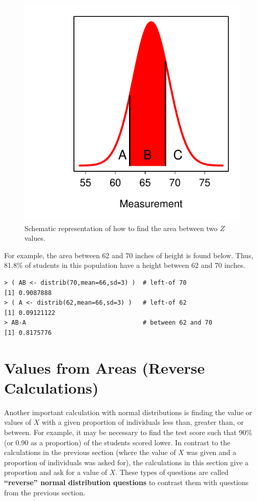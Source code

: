 \documentclass[10pt,openany]{book}\usepackage[]{graphicx}\usepackage[]{color}
\makeatletter
\newenvironment{kframe}{%
 \def\at@end@of@kframe{}%
 \ifinner\ifhmode%
  \def\at@end@of@kframe{\end{minipage}}%
  \begin{minipage}{\columnwidth}%
 \fi\fi%
 \def\FrameCommand##1{\hskip\@totalleftmargin \hskip-\fboxsep
 \colorbox{shadecolor}{##1}\hskip-\fboxsep
     \hskip-\linewidth \hskip-\@totalleftmargin \hskip\columnwidth}%
 \MakeFramed {\advance\hsize-\width
   \@totalleftmargin\z@ \linewidth\hsize
   \@setminipage}}%
 {\par\unskip\endMakeFramed%
 \at@end@of@kframe}
\newenvironment{knitrout}{}{} %
\makeatother
\begin{document}
\begin{knitrout}
\color{fgcolor}\begin{figure}[hbtp]

{\centering \includegraphics[width=.4\linewidth]{Figs/NormDistBetween-1} 

}

\caption[Schematic representation of how to find the area between two $Z$ values]{Schematic representation of how to find the area between two $Z$ values.}\label{fig:NormDistBetween}
\end{figure}


\end{knitrout}
\vspace{12pt} %

For example, the area between 62 and 70 inches of height is found below. Thus, 81.8\% of students in this population have a height between 62 and 70 inches.

\begin{knitrout}
\color{fgcolor}\begin{kframe}
\begin{verbatim}
> ( AB <- distrib(70,mean=66,sd=3) )  # left-of 70
[1] 0.9087888
> ( A <- distrib(62,mean=66,sd=3) )   # left-of 62
[1] 0.09121122
> AB-A                                # between 62 and 70
[1] 0.8175776
\end{verbatim}
\end{kframe}
\end{knitrout}




\section[Reverse Calculations]{Values from Areas (Reverse Calculations)}
Another important calculation with normal distributions is finding the value or values of $X$ with a given proportion of individuals less than, greater than, or between. For example, it may be necessary to find the test score such that 90\% (or 0.90 as a proportion) of the students scored lower. In contrast to the calculations in the previous section (where the value of $X$ was given and a proportion of individuals was asked for), the calculations in this section give a proportion and ask for a value of $X$. These types of questions are called \textbf{``reverse'' normal distribution questions} to contrast them with questions from the previous section.
\end{document}
